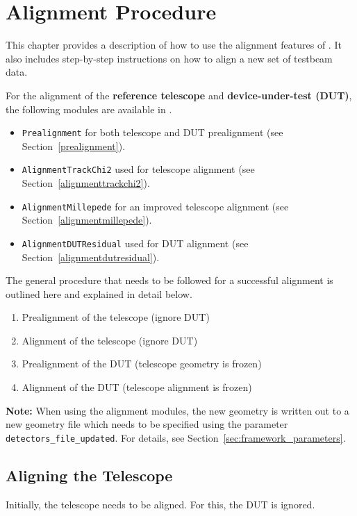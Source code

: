 \chapter{Alignment Procedure}
\label{ch:howtoalign}

This chapter provides a description of how to use the alignment features of \corry. 
It also includes step-by-step instructions on how to align a new set of testbeam data.

For the alignment of the \textbf{reference telescope} and \textbf{device-under-test (DUT)}, the following modules are available in \corry.
\begin{itemize}
\item \texttt{Prealignment} for both telescope and DUT prealignment (see Section~\ref{prealignment}).
\item \texttt{AlignmentTrackChi2} used for telescope alignment (see Section~\ref{alignmenttrackchi2}).
\item \texttt{AlignmentMillepede} for an improved telescope alignment (see Section~\ref{alignmentmillepede}).
\item \texttt{AlignmentDUTResidual} used for DUT alignment (see Section~\ref{alignmentdutresidual}).
\end{itemize}

The general procedure that needs to be followed for a successful alignment is outlined here and explained in detail below.
\begin{enumerate}
\item Prealignment of the telescope (ignore DUT)
\item Alignment of the telescope (ignore DUT)
\item Prealignment of the DUT (telescope geometry is frozen)
\item Alignment of the DUT (telescope alignment is frozen)
\end{enumerate}

\textbf{Note:} When using the alignment modules, the new geometry is written out to a new geometry file which needs to be specified using the parameter \texttt{detectors\_file\_updated}.
For details, see Section~\ref{sec:framework_parameters}.

\section{Aligning the Telescope}
\label{sec:align_tel}
Initially, the telescope needs to be aligned. 
For this, the DUT is ignored.

